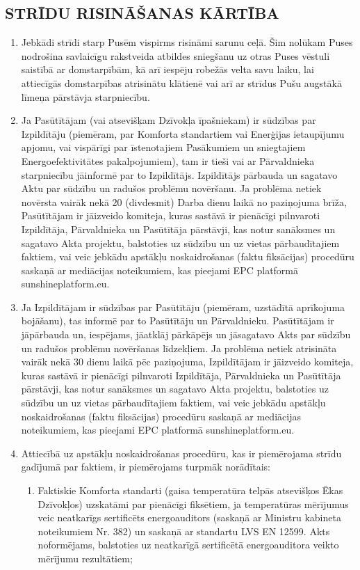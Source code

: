 \begin{multicols}{2}
\subsection{STRĪDU RISINĀŠANAS KĀRTĪBA}
\begin{enumerate}
	\item Jebkādi strīdi starp Pusēm vispirms risināmi sarunu ceļā. Šim nolūkam Puses nodrošina savlaicīgu rakstveida atbildes sniegšanu uz otras Puses vēstuli saistībā ar domstarpībām, kā arī iespēju robežās velta savu laiku, lai attiecīgās domstarpības atrisinātu klātienē vai arī ar strīdus Pušu augstākā līmeņa pārstāvja starpniecību.
	\item Ja Pasūtītājam (vai atsevišķam Dzīvokļa īpašniekam) ir sūdzības par Izpildītāju (piemēram, par Komforta standartiem vai Enerģijas ietaupījumu apjomu, vai vispārīgi par īstenotajiem Pasākumiem un sniegtajiem Energoefektivitātes pakalpojumiem), tam ir tieši vai ar Pārvaldnieka starpniecību jāinformē par to Izpildītājs. Izpildītājs pārbauda un sagatavo Aktu par sūdzību un radušos problēmu novēršanu. Ja problēma netiek novērsta vairāk nekā 20 (divdesmit) Darba dienu laikā no paziņojuma brīža, Pasūtītājam ir jāizveido komiteja, kuras sastāvā ir pienācīgi pilnvaroti Izpildītāja, Pārvaldnieka un Pasūtītāja pārstāvji, kas notur sanāksmes un sagatavo Akta projektu, balstoties uz sūdzību un uz vietas pārbaudītajiem faktiem, vai veic jebkādu apstākļu noskaidrošanas (faktu fiksācijas) procedūru saskaņā ar mediācijas noteikumiem, kas pieejami EPC platformā sunshineplatform.eu.
	\item Ja Izpildītājam ir sūdzības par Pasūtītāju (piemēram, uzstādītā aprīkojuma bojāšanu), tas informē par to Pasūtītāju un Pārvaldnieku. Pasūtītājam ir jāpārbauda un, iespējams, jāatklāj pārkāpējs un jāsagatavo Akts par sūdzību un radušos problēmu novēršanas līdzekļiem. Ja problēma netiek atrisināta vairāk nekā 30 dienu laikā pēc paziņojuma, Izpildītājam ir jāizveido komiteja, kuras sastāvā ir pienācīgi pilnvaroti Izpildītāja, Pārvaldnieka un Pasūtītāja pārstāvji, kas notur sanāksmes un sagatavo Akta projektu, balstoties uz sūdzību un uz vietas pārbaudītajiem faktiem, vai veic jebkādu apstākļu noskaidrošanas (faktu fiksācijas) procedūru saskaņā ar mediācijas noteikumiem, kas pieejami EPC platformā sunshineplatform.eu.
	\item Attiecībā uz apstākļu noskaidrošanas procedūru, kas ir piemērojama strīdu gadījumā par faktiem, ir piemērojams turpmāk norādītais:
	\begin{enumerate}
		\item Faktiskie Komforta standarti (gaisa temperatūra telpās atsevišķos Ēkas Dzīvokļos) uzskatāmi par pienācīgi fiksētiem, ja temperatūras mērījumus veic neatkarīgs sertificēts energoauditors (saskaņā ar Ministru kabineta noteikumiem Nr. 382) un saskaņā ar standartu LVS EN 12599. Akts noformējams, balstoties uz neatkarīgā sertificētā energoauditora veikto mērījumu rezultātiem;

\end{enumerate}
\end{enumerate}
\end{multicols}
